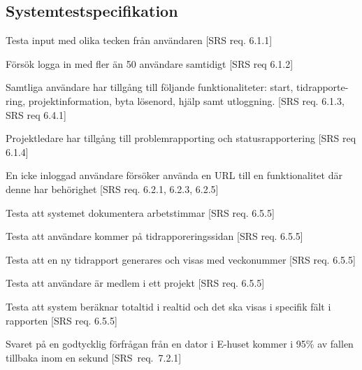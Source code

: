 \documentclass[a4paper]{article}
\begin{document}
\begin{appendices}

\section{Systemtestspecifikation}

\begin{ST}


\item 
Testa input med olika tecken från användaren [SRS req. 6.1.1]

\item
Försök logga in med fler än 50 användare samtidigt [SRS req 6.1.2]

\item 
Samtliga användare har tillgång till följande funktionaliteter: start, tidrapporte-
ring, projektinformation, byta lösenord, hjälp samt utloggning. [SRS req. 6.1.3, SRS req 6.4.1]

\item 
Projektledare har tillgång till problemrapporting och statusrapportering [SRS req 6.1.4]

\item
En icke inloggad användare försöker använda en URL till en funktionalitet där denne har behörighet [SRS req. 6.2.1, 6.2.3, 6.2.5]

\item 
Testa att systemet dokumentera arbetstimmar [SRS req. 6.5.5]

\item 
Testa att användare kommer på tidrapporeringssidan [SRS req. 6.5.5]

\item 
Testa att en ny tidrapport generares och visas med veckonummer [SRS req. 6.5.5]

\item 
Testa att användare är medlem i ett projekt [SRS req. 6.5.5]

\item 
Testa att system beräknar totaltid i realtid och det ska visas i specifik fält i rapporten [SRS req. 6.5.5]

\item
Svaret på en godtycklig förfrågan från en dator i E-huset kommer i 95\% av fallen tillbaka inom en sekund [SRS~req.~7.2.1]

\end{ST}




\end{appendices}
\end{document}
